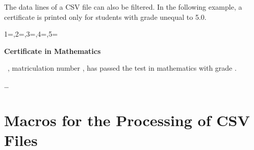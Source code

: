 \documentclass[a4paper,11pt]{ltxdoc}
\begin{document}
\smallskip
The data lines of a CSV file can also be filtered. In the following example,
a certificate is printed only for students with grade unequal to 5.0.

\begin{dispExample}
  {1=\name,2=\firstname,3=\matnumber,4=\gender,5=\grade}{%
    \begin{center}\Large\bfseries Certificate in Mathematics\end{center}
    \large{}
    \firstname~\name, matriculation number \matnumber, has passed the test
    in mathematics with grade \grade.\par\ldots\par
  }%
\end{dispExample}


\clearpage
\section{Macros for the Processing of CSV Files}\label{sec:makros}%
\end{document}
